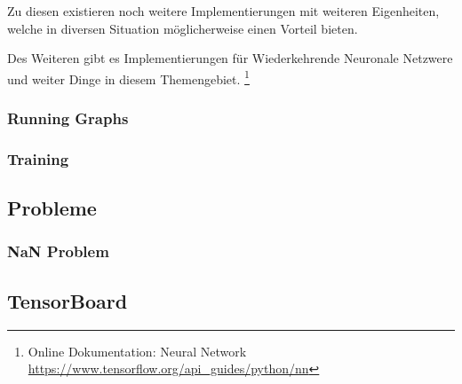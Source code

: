 \noindent
Zu diesen existieren noch weitere Implementierungen mit weiteren Eigenheiten, welche in diversen Situation möglicherweise einen Vorteil bieten. 


\noindent
Des Weiteren gibt es Implementierungen für Wiederkehrende Neuronale Netzwere und weiter Dinge in diesem Themengebiet. 
\footnote{Online Dokumentation: Neural Network \url{https://www.tensorflow.org/api_guides/python/nn}}

\subsubsection{Running Graphs}

\subsubsection{Training}

\subsection{Probleme}

\subsubsection{NaN Problem}

\subsection{TensorBoard}